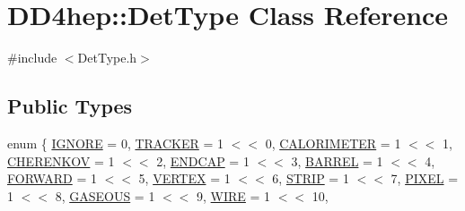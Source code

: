 \hypertarget{class_d_d4hep_1_1_det_type}{}\section{D\+D4hep\+:\+:Det\+Type Class Reference}
\label{class_d_d4hep_1_1_det_type}


{\ttfamily \#include $<$Det\+Type.\+h$>$}

\subsection*{Public Types}
\begin{DoxyCompactItemize}
\item 
enum \{ \newline
\hyperlink{class_d_d4hep_1_1_det_type_aca757d7a9b865d1fb8f7997eb5c0a72ca893501e77c51655ce8733333a0fd0b7b}{I\+G\+N\+O\+RE} = 0, 
\hyperlink{class_d_d4hep_1_1_det_type_aca757d7a9b865d1fb8f7997eb5c0a72cae974ecec59fd2a2900db7e5f44cd0884}{T\+R\+A\+C\+K\+ER} = 1 $<$$<$ 0, 
\hyperlink{class_d_d4hep_1_1_det_type_aca757d7a9b865d1fb8f7997eb5c0a72ca49b1bf5367ff45451add8edbeb91fdfc}{C\+A\+L\+O\+R\+I\+M\+E\+T\+ER} = 1 $<$$<$ 1, 
\hyperlink{class_d_d4hep_1_1_det_type_aca757d7a9b865d1fb8f7997eb5c0a72ca860f2491216e5b5b990a25f9ec20c810}{C\+H\+E\+R\+E\+N\+K\+OV} = 1 $<$$<$ 2, 
\newline
\hyperlink{class_d_d4hep_1_1_det_type_aca757d7a9b865d1fb8f7997eb5c0a72ca0f447c234bc6e949ee7cfab0fef5a408}{E\+N\+D\+C\+AP} = 1 $<$$<$ 3, 
\hyperlink{class_d_d4hep_1_1_det_type_aca757d7a9b865d1fb8f7997eb5c0a72caaca38656f429ac259f2aeb2a22359c1e}{B\+A\+R\+R\+EL} = 1 $<$$<$ 4, 
\hyperlink{class_d_d4hep_1_1_det_type_aca757d7a9b865d1fb8f7997eb5c0a72cad6006f8399753305eec23b7be341de8b}{F\+O\+R\+W\+A\+RD} = 1 $<$$<$ 5, 
\hyperlink{class_d_d4hep_1_1_det_type_aca757d7a9b865d1fb8f7997eb5c0a72cadd4fea08e228d05a34ba2e613697d85e}{V\+E\+R\+T\+EX} = 1 $<$$<$ 6, 
\newline
\hyperlink{class_d_d4hep_1_1_det_type_aca757d7a9b865d1fb8f7997eb5c0a72ca47882873d22cd7ded73b8599713e5c98}{S\+T\+R\+IP} = 1 $<$$<$ 7, 
\hyperlink{class_d_d4hep_1_1_det_type_aca757d7a9b865d1fb8f7997eb5c0a72ca1f451f05a5274d067d92755139995dd3}{P\+I\+X\+EL} = 1 $<$$<$ 8, 
\hyperlink{class_d_d4hep_1_1_det_type_aca757d7a9b865d1fb8f7997eb5c0a72ca80e57e0db6dcb4c29a22b45f3f4cbbb1}{G\+A\+S\+E\+O\+US} = 1 $<$$<$ 9, 
\hyperlink{class_d_d4hep_1_1_det_type_aca757d7a9b865d1fb8f7997eb5c0a72ca48f5950dd5739306bfb69120dca0c01c}{W\+I\+RE} = 1 $<$$<$ 10, 
\newline
$$
\end{DoxyCompactItemize}
